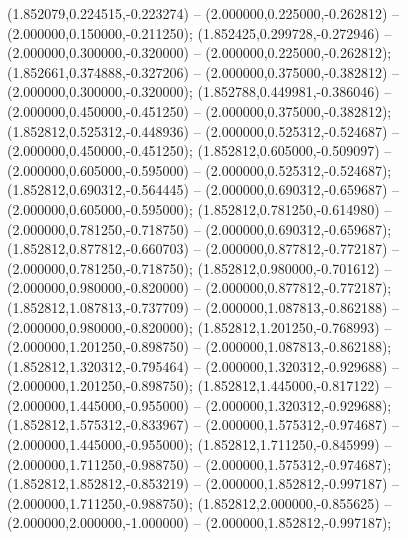  (1.852079,0.224515,-0.223274) -- (2.000000,0.225000,-0.262812) -- (2.000000,0.150000,-0.211250);
 (1.852425,0.299728,-0.272946) -- (2.000000,0.300000,-0.320000) -- (2.000000,0.225000,-0.262812);
 (1.852661,0.374888,-0.327206) -- (2.000000,0.375000,-0.382812) -- (2.000000,0.300000,-0.320000);
 (1.852788,0.449981,-0.386046) -- (2.000000,0.450000,-0.451250) -- (2.000000,0.375000,-0.382812);
 (1.852812,0.525312,-0.448936) -- (2.000000,0.525312,-0.524687) -- (2.000000,0.450000,-0.451250);
 (1.852812,0.605000,-0.509097) -- (2.000000,0.605000,-0.595000) -- (2.000000,0.525312,-0.524687);
 (1.852812,0.690312,-0.564445) -- (2.000000,0.690312,-0.659687) -- (2.000000,0.605000,-0.595000);
 (1.852812,0.781250,-0.614980) -- (2.000000,0.781250,-0.718750) -- (2.000000,0.690312,-0.659687);
 (1.852812,0.877812,-0.660703) -- (2.000000,0.877812,-0.772187) -- (2.000000,0.781250,-0.718750);
 (1.852812,0.980000,-0.701612) -- (2.000000,0.980000,-0.820000) -- (2.000000,0.877812,-0.772187);
 (1.852812,1.087813,-0.737709) -- (2.000000,1.087813,-0.862188) -- (2.000000,0.980000,-0.820000);
 (1.852812,1.201250,-0.768993) -- (2.000000,1.201250,-0.898750) -- (2.000000,1.087813,-0.862188);
 (1.852812,1.320312,-0.795464) -- (2.000000,1.320312,-0.929688) -- (2.000000,1.201250,-0.898750);
 (1.852812,1.445000,-0.817122) -- (2.000000,1.445000,-0.955000) -- (2.000000,1.320312,-0.929688);
 (1.852812,1.575312,-0.833967) -- (2.000000,1.575312,-0.974687) -- (2.000000,1.445000,-0.955000);
 (1.852812,1.711250,-0.845999) -- (2.000000,1.711250,-0.988750) -- (2.000000,1.575312,-0.974687);
 (1.852812,1.852812,-0.853219) -- (2.000000,1.852812,-0.997187) -- (2.000000,1.711250,-0.988750);
 (1.852812,2.000000,-0.855625) -- (2.000000,2.000000,-1.000000) -- (2.000000,1.852812,-0.997187);
